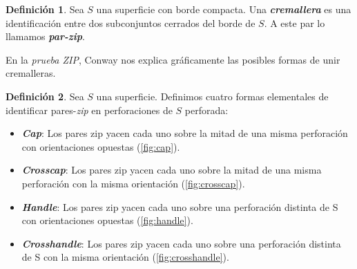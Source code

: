 \documentclass[10pt]{report}
\newcommand{\enfatiza}[1]{\textbf{\textit{#1}}}
\theoremstyle{definition}
\newtheorem{defin}{Definición}[section]
\begin{document}
\begin{defin}%
Sea $S$ una superficie con borde compacta. Una \enfatiza{cremallera} es una identificación entre dos subconjuntos cerrados del borde de $S$. A este par lo llamamos \enfatiza{par-zip}.
\end{defin}


En la \textit{prueba ZIP}, Conway nos explica gráficamente las posibles formas de unir cremalleras. 

\begin{defin}
Sea $S$ una superficie. Definimos cuatro formas elementales de identificar pares-\textit{zip} en perforaciones de 
$S$ perforada:

\begin{itemize}
\item[1.] \enfatiza{Cap}: Los pares zip yacen cada uno sobre la mitad de una misma perforación con orientaciones opuestas (\autoref{fig:cap}).
\item[2.] \enfatiza{Crosscap}: Los pares zip yacen cada uno sobre la mitad de una misma perforación con la misma orientación (\autoref{fig:crosscap}).
\item[3.] \enfatiza{Handle}: Los pares zip yacen cada uno sobre una perforación distinta de S con orientaciones opuestas (\autoref{fig:handle}).
\item[4.] \enfatiza{Crosshandle}: Los pares zip yacen cada uno sobre una perforación distinta de S con la misma orientación (\autoref{fig:crosshandle}).
\end{itemize}
\end{defin}
\end{document}
